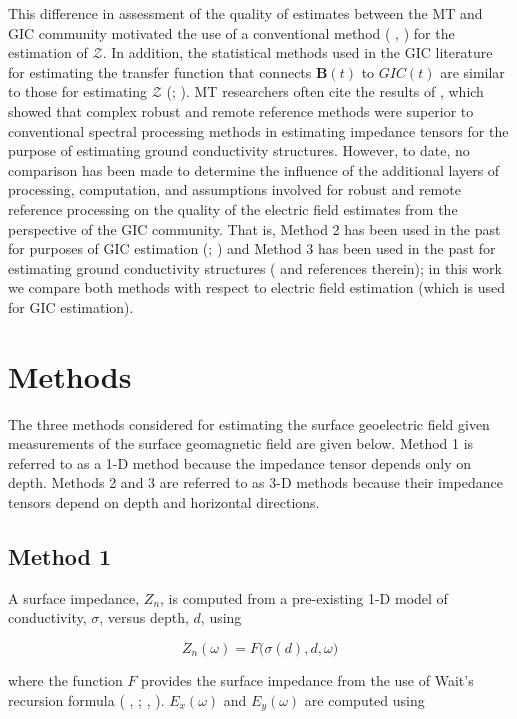 \documentclass[12pt]{article}
\newcommand{\citeay}[1]{%
\citeauthor{#1}, \citeyear{#1}%
}
\begin{document}
This difference in assessment of the quality of estimates between the MT and GIC community motivated the use of a conventional method (\citeay{Sims1971}) for the estimation of $\mathcal{Z}$.  In addition, the statistical methods used in the GIC literature for estimating the transfer function that connects $\mathbf{B}(t)$ to $GIC(t)$ are similar to those for estimating $\mathcal{Z}$ (\cite{McKay2003}; \cite{Pulkkinen2007}). MT researchers often cite the results of \cite{Jones1989}, which showed that complex robust and remote reference methods were superior to conventional spectral processing methods in estimating impedance tensors for the purpose of estimating ground conductivity structures.  However, to date, no comparison has been made to determine the influence of the additional layers of processing, computation, and assumptions involved for robust and remote reference processing on the quality of the electric field estimates from the perspective of the GIC community.  That is, Method 2 has been used in the past for purposes of GIC estimation (\cite{McKay2003}; \cite{Pulkkinen2007}) and Method 3 has been used in the past for estimating ground conductivity structures (\cite{Chave2012} and references therein); in this work we compare both methods with respect to electric field estimation (which is used for GIC estimation).

\section{Methods}

The three methods considered for estimating the surface geoelectric field given measurements of the surface geomagnetic field are given below.  Method 1 is referred to as a 1-D method because the impedance tensor depends only on depth.  Methods 2 and 3 are referred to as 3-D methods because their impedance tensors depend on depth and horizontal directions.

\subsection{Method 1}

A surface impedance, $Z_n$, is computed from a pre-existing 1-D model of conductivity, $\sigma$, versus depth, $d$, using

\begin{equation}
Z_{n}(\omega) = F\big(\sigma(d),d,\omega\big)
\end{equation}

\noindent where the function $F$ provides the surface impedance from the use of Wait's recursion formula (\citeay{Wait1954}; \citeay{Simpson2005}). $E_x(\omega)$ and $E_y(\omega)$ are computed using
\end{document}
